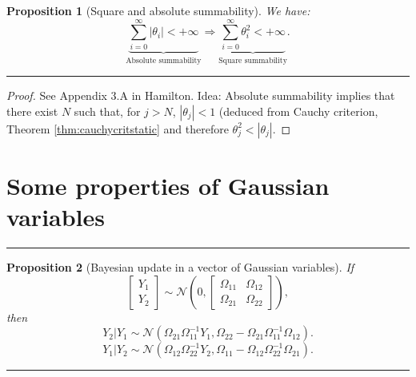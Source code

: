 \documentclass[
]{book}
\newtheorem{proposition}{Proposition}[chapter]
\theoremstyle{definition}
\theoremstyle{definition}
\theoremstyle{definition}
\theoremstyle{definition}
\theoremstyle{remark}
\begin{document}
\begin{proposition}[Square and absolute summability]
\protect\hypertarget{prp:absMs}{}\label{prp:absMs}We have:
\[
\underbrace{\sum_{i=0}^{\infty}|\theta_i| < + \infty}_{\mbox{Absolute summability}} \Rightarrow \underbrace{\sum_{i=0}^{\infty} \theta_i^2 < + \infty}_{\mbox{Square summability}}.
\]
\end{proposition}

\begin{center}\rule{0.5\linewidth}{0.5pt}\end{center}

\begin{proof}
See Appendix 3.A in Hamilton. Idea: Absolute summability implies that there exist \(N\) such that, for \(j>N\), \(|\theta_j| < 1\) (deduced from Cauchy criterion, Theorem \ref{thm:cauchycritstatic} and therefore \(\theta_j^2 < |\theta_j|\).
\end{proof}

\hypertarget{GaussianVar}{%
\section{Some properties of Gaussian variables}\label{GaussianVar}}

\begin{center}\rule{0.5\linewidth}{0.5pt}\end{center}

\begin{proposition}[Bayesian update in a vector of Gaussian variables]
\protect\hypertarget{prp:update}{}\label{prp:update}If
\[
\left[
\begin{array}{c}
Y_1\\
Y_2
\end{array}
\right]
\sim \mathcal{N}
\left(0,
\left[\begin{array}{cc}
\Omega_{11} & \Omega_{12}\\
\Omega_{21} & \Omega_{22}
\end{array}\right]
\right),
\]
then
\[
Y_{2}|Y_{1} \sim \mathcal{N}
\left(
\Omega_{21}\Omega_{11}^{-1}Y_{1},\Omega_{22}-\Omega_{21}\Omega_{11}^{-1}\Omega_{12}
\right).
\]
\[
Y_{1}|Y_{2} \sim \mathcal{N}
\left(
\Omega_{12}\Omega_{22}^{-1}Y_{2},\Omega_{11}-\Omega_{12}\Omega_{22}^{-1}\Omega_{21}
\right).
\]
\end{proposition}

\begin{center}\rule{0.5\linewidth}{0.5pt}\end{center}
\end{document}

